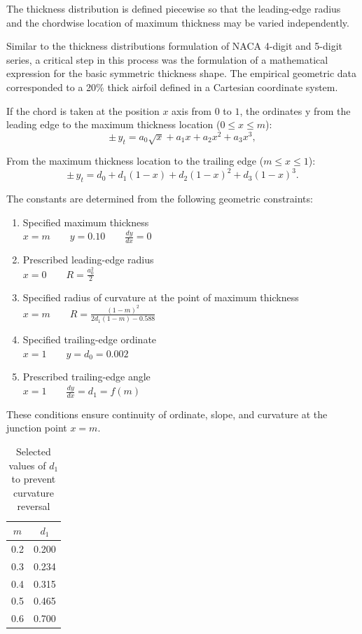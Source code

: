The thickness distribution is defined piecewise so that the leading-edge 
radius and the chordwise location of maximum thickness may be varied 
independently.

Similar to the thickness distributions formulation of NACA 4-digit and 5-digit series, a critical step in this process was the formulation of a mathematical expression 
for the basic symmetric thickness shape. The empirical geometric data corresponded 
to a 20\% thick airfoil defined in a Cartesian coordinate system.

If the chord is taken at the position $x$ axis from $0$ to $1$, the ordinates y from the leading edge to the maximum thickness location 
($0 \le x \le m$):
\[
\pm\, y_t =
a_0 \sqrt{x}
+ a_1 x
+ a_2 x^2
+ a_3 x^3,
\]

From the maximum thickness location to the trailing edge 
($m \le x \le 1$):
\[
\pm\, y_t =
d_0
+ d_1 (1-x)
+ d_2 (1-x)^2
+ d_3 (1-x)^3.
\]

The constants are determined from the following geometric constraints:

\begin{enumerate}
\renewcommand{\labelenumi}{(\arabic{enumi})}
\item Specified maximum thickness\\[10pt]
$ 
x=m \qquad y=0.10 \qquad \displaystyle \frac{dy}{dx}=0
$

\item Prescribed leading-edge radius\\[10pt]
$
x=0 \qquad \displaystyle R=\frac{a_0^2}{2}
$
\item Specified radius of curvature at the point of maximum thickness\\[10pt]
$
x=m \qquad \displaystyle R=\frac{(1-m)^2}{2d_1(1-m)-0.588}
$
\item Specified trailing-edge ordinate\\[10pt]
$
x=1 \qquad y=d_0=0.002
$
\item Prescribed trailing-edge angle\\[10pt]
$
x=1 \qquad \displaystyle \frac{dy}{dx}=d_1=f(m)
$
\end{enumerate}

These conditions ensure continuity of ordinate, slope, and curvature 
at the junction point $x = m$.

\begin{table}[h!]
\centering
\label{tab:d1_values}
\begin{tabular}{|c|c|}
\hline
$m$ & $d_1$ \\
\hline
0.2 & 0.200 \\
0.3 & 0.234 \\
0.4 & 0.315 \\
0.5 & 0.465 \\
0.6 & 0.700 \\
\hline
\end{tabular}
\caption{Selected values of $d_1$ to prevent curvature reversal \cite{NACA_TR_492}}
\end{table}

